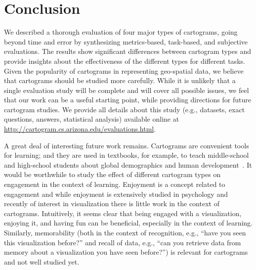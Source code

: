 \documentclass[10pt,journal,compsoc]{IEEEtran}
\begin{document}
\section {Conclusion}

We described a thorough evaluation of four major types of cartograms, going beyond time and error by synthesizing metrics-based, task-based, and subjective evaluations. The results show significant differences between cartogram types and provide insights about the effectiveness of the different types for different tasks. Given the popularity of cartograms in representing geo-spatial data, we believe that cartograms should be studied more carefully. While it is unlikely that a single evaluation study will be complete and will cover all possible issues, we feel that our work can be a useful starting point, while providing directions for future cartogram studies. We provide all details about this study (e.g., datasets, exact questions, answers, statistical analysis) available online at \url{http://cartogram.cs.arizona.edu/evaluations.html}.

A great deal of interesting future work remains. 
Cartograms are convenient tools for learning; and they are used in textbooks, for example, to teach middle-school and high-school students about global demographics and human development~\cite{Class2}. It would be worthwhile to study the effect of different cartogram types on engagement in the context of learning. Enjoyment is a concept related to engagement and while enjoyment is extensively studied in psychology and recently of interest in visualization there is little work in the context of cartograms.
Intuitively, it seems clear that being engaged with a visualization, enjoying it, and having fun can be beneficial, especially in the context of learning. 
Similarly, memorability (both in the context of recognition, e.g., ``have you seen this visualization before?'' and recall of data, e.g., ``can you retrieve data from memory about a visualization you have seen before?'') is relevant for cartograms and not well studied yet.
\end{document}
